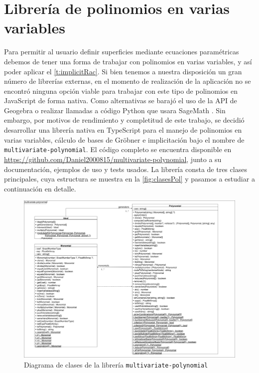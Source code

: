 \section{Librería de polinomios en varias variables}\label{sec:lib}
Para permitir al usuario definir superficies mediante ecuaciones paramétricas debemos de tener una forma de trabajar con polinomios en varias variables, y así poder aplicar el \autoref{t:implicitRac}. Si bien tenemos a nuestra disposición un gran número de librerías externas, en el momento de realización de la aplicación no se encontró ninguna opción viable para trabajar con este tipo de polinomios en JavaScript de forma nativa. Como alternativas se barajó el uso de la API de Geogebra \cite{geogebra} o realizar llamadas a código Python que usara SageMath \cite{sage}. Sin embargo, por motivos de rendimiento y completitud de este trabajo, se decidió desarrollar una librería nativa en TypeScript para el manejo de polinomios en varias variables, cálculo de bases de Gröbner e implicitación bajo el nombre de \texttt{multivariate-polynomial}. El código completo se encuentra disponible en \href{https://github.com/Daniel2000815/multivariate-polynomial}{https://github.com/Daniel2000815/multivariate-polynomial}, junto a su documentación, ejemplos de uso y tests usados. La librería consta de tres clases principales, cuya estructura se muestra en la \autoref{fig:clasesPol} y pasamos a estudiar a continuación en detalle.
\begin{figure}[ht!]
    \centering
    \includegraphics[width=\textwidth]{Plantilla-TFG-master/img/clasesPol.png}
    \caption{Diagrama de clases de la librería \texttt{multivariate-polynomial}}
    \label{fig:clasesPol}
\end{figure}

